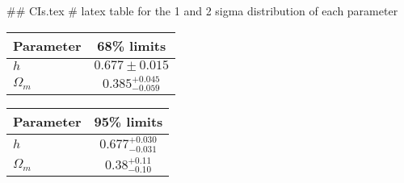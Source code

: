 ## CIs.tex
# latex table for the 1 and 2 sigma distribution of each parameter

\begin{tabular} { l  c}
 Parameter &  68\% limits\\
\hline
{\boldmath$h              $} & $0.677\pm 0.015            $\\
{\boldmath$\Omega_m       $} & $0.385^{+0.045}_{-0.059}   $\\
\hline
\end{tabular}

\begin{tabular} { l  c}
 Parameter &  95\% limits\\
\hline
{\boldmath$h              $} & $0.677^{+0.030}_{-0.031}   $\\
{\boldmath$\Omega_m       $} & $0.38^{+0.11}_{-0.10}      $\\
\hline
\end{tabular}
